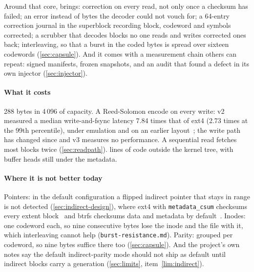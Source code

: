 Around that core, \bfs brings: correction on every read, not only once a
checksum has failed; an error instead of bytes the decoder could not
vouch for; a 64-entry correction journal in the superblock recording
block, codeword and symbols corrected; a scrubber that decodes blocks no
one reads and writes corrected ones back; interleaving, so that a burst
in the coded bytes is spread over sixteen codewords
(\cref{sec:capsule}). And it comes with a measurement chain others can
repeat: signed manifests, frozen snapshots, and an audit that found a
defect in its own injector (\cref{sec:injector}).

\paragraph*{What it costs}
288 bytes in 4\,096 of capacity. A Reed-Solomon encode on every write:
v2 measured a median write-and-fsync latency 7.84 times that of ext4
(2.73 times at the 99th percentile), under emulation and on an earlier
layout~\cite{desbrieres2026beamfsv2}; the write path has changed since
and v3 measures no performance. A sequential read fetches most blocks
twice (\cref{sec:readpath}). \moduleLines{} lines of code outside the
kernel tree, with buffer heads still under the metadata.

\paragraph*{Where it is not better today}
Pointers: in the default configuration a flipped indirect pointer that
stays in range is not detected (\cref{sec:indirect-design}), where ext4
with \texttt{metadata\_csum} checksums every extent block~\cite{ext4csum}
and btrfs checksums data and metadata by default~\cite{btrfscsum}.
Inodes: one codeword each, so nine consecutive bytes lose the inode and
the file with it, which interleaving cannot help
(\texttt{burst-resistance.md}). Parity: grouped per codeword, so nine
bytes suffice there too (\cref{sec:capsule}). And the project's own
notes say the default indirect-parity mode should not ship as default
until indirect blocks carry a generation (\cref{sec:limits}, item~\ref{lim:indirect}).
